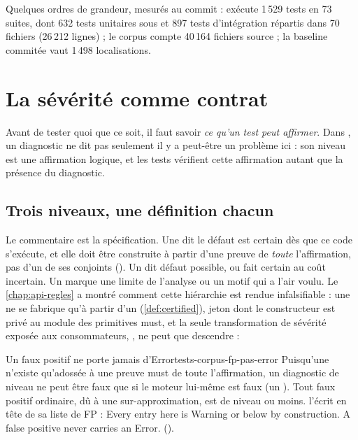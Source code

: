 Quelques ordres de grandeur, mesurés au commit \snapshotCommit{} :  exécute 1\,529 tests en 73 suites, dont 632 tests unitaires sous  et 897 tests d'intégration répartis dans 70 fichiers  (26\,212 lignes) ; le corpus compte 40\,164 fichiers source ; la baseline commitée vaut 1\,498 localisations.

\section{La sévérité comme contrat}
\label{sec:tests-corpus-severite}

Avant de tester quoi que ce soit, il faut savoir \emph{ce qu'un test peut affirmer}. Dans \reactant{}, un diagnostic ne dit pas seulement \og il y a peut-être un problème ici\fg{} : son niveau est une affirmation logique, et les tests vérifient cette affirmation autant que la présence du diagnostic.

\subsection{Trois niveaux, une définition chacun}


Le commentaire est la spécification. Une \Error{} dit \og le défaut est certain dès que ce code s'exécute\fg{}, et elle doit être construite à partir d'une preuve de \emph{toute} l'affirmation, pas d'un de ses conjoints (). Un \Warning{} dit \og défaut possible\fg{}, ou \og fait certain au coût incertain\fg{}. Un \Info{} marque une limite de l'analyse ou un motif qui a l'air voulu. Le \cref{chap:api-regles} a montré comment cette hiérarchie est rendue infalsifiable : une \Error{} ne se fabrique qu'à partir d'un  (\cref{def:certified}), jeton dont le constructeur est privé au module des primitives must, et la seule transformation de sévérité exposée aux consommateurs, , ne peut que descendre :


\begin{invariant}{Un faux positif ne porte jamais d'Error}{tests-corpus-fp-pas-error}
Puisqu'une \Error{} n'existe qu'adossée à une preuve must de toute l'affirmation, un diagnostic de niveau \Error{} ne peut être faux que si le moteur lui-même est faux (un ). Tout faux positif \og ordinaire\fg{}, dû à une sur-approximation, est de niveau \Warning{} ou moins.  l'écrit en tête de sa liste de FP : \og Every entry here is Warning or below by construction. A false positive never carries an Error.\fg{} ().
\end{invariant}

